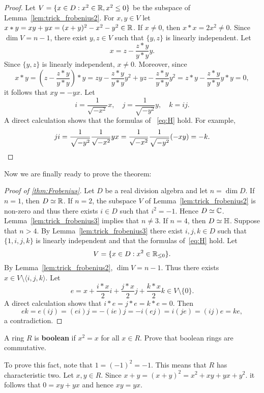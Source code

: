\begin{proof}
	Let $V=\{x\in D:x^2\in\mathbb{R},x^2\leq 0\}$ be the subspace of Lemma~\ref{lem:trick_frobenius2}. 
	For $x,y\in V$ let $x*
	y=xy+yx=(x+y)^2-x^2-y^2\in\mathbb{R}$. If $x\ne0$, then $x*
	x=2x^2\ne0$. Since $\dim V=n-1$, there exist $y,z\in V$ such that $\{y,z\}$ is 
	linearly independent. Let 
	\[
		x=z-\frac{z* y}{y* y}y.
	\]
	Since $\{y,z\}$ is linearly independent, $x\ne0$. Moreover, since 
	\[
		x* y
		=\left(z-\frac{z* y}{y* y}\right)* y
		=zy-\frac{z* y}{y* y}y^2+yz-\frac{z* y}{y* y}y^2
		=z* y-\frac{z* y}{y* y}y* y=0,
	\]
	it follows that $xy=-yx$. 
	Let  
	\[
		i=\frac{1}{\sqrt{-x^2}}x,
		\quad
		j=\frac{1}{\sqrt{-y^2}}y,
		\quad
		k=ij. 
	\]
	A direct calculation shows that the formulas of ~\eqref{eq:H} hold. For example, 
	\[
		ji=\frac{1}{\sqrt{-y^2}}\frac{1}{\sqrt{-x^2}}yx=\frac{1}{\sqrt{-x^2}}\frac{1}{\sqrt{-y^2}}(-xy)=-k.\qedhere
	\]
\end{proof}

Now we are finally 
ready to prove the theorem: 

\begin{proof}[Proof of \ref{thm:Frobenius}]
	Let $D$ be a real division algebra and let $n=\dim D$. If $n=1$, then 
	$D\simeq\mathbb{R}$. If $n=2$, the subspace $V$ of Lemma~\ref{lem:trick_frobenius2} 
	is non-zero and thus there exists $i\in D$ such that 
	$i^2=-1$. Hence $D\simeq\mathbb{C}$. Lemma~\ref{lem:trick_frobenius3}
	implies that $n\ne3$. If $n=4$, then $D\simeq\mathbb{H}$. Suppose that 
	$n>4$.  By Lemma~\ref{lem:trick_frobenius3} there exist
	$i,j,k\in D$ such that $\{1,i,j,k\}$ is linearly independent 
	and that the formulas of~\eqref{eq:H} hold. Let 
	\[
		V=\{x\in D:x^2\in\mathbb{R}_{\leq0}\}.
	\]
	By Lemma~\ref{lem:trick_frobenius2}, $\dim V=n-1$. Thus there exists 
	$x\in V\setminus\langle i,j,k\rangle$. Let 
	\[
		e=x+\frac{i* x}{2}i+\frac{j* x}{2}j+\frac{k* x}{2}k\in V\setminus\{0\}.
	\]
	A direct calculation shows that $i* e=j* e=k* e=0$. Then 
	\[
		ek=e(ij)=(ei)j=-(ie)j=-i(ej)=i(je)=(ij)e=ke,
	\]
	a contradiction. 
\end{proof}


\begin{exercise}
    A ring $R$ is \textbf{boolean} if $x^2=x$ for all $x\in R$. 
    Prove that boolean rings are commutative. 
\end{exercise}

To prove this fact, note that $1=(-1)^2=-1$. This means that $R$ has
characteristic two. Let $x,y\in R$. Since $x+y=(x+y)^2=x^2+xy+yx+y^2$. 
it follows that $0=xy+yx$ and hence $xy=yx$.

